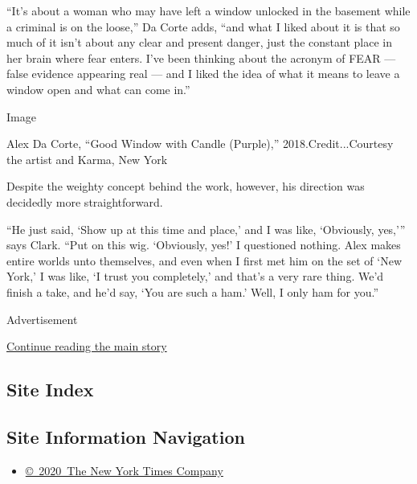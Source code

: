 ``It's about a woman who may have left a window unlocked in the basement
while a criminal is on the loose,'' Da Corte adds, ``and what I liked
about it is that so much of it isn't about any clear and present danger,
just the constant place in her brain where fear enters. I've been
thinking about the acronym of FEAR --- false evidence appearing real ---
and I liked the idea of what it means to leave a window open and what
can come in.''

Image

Alex Da Corte, ``Good Window with Candle (Purple),''
2018.Credit...Courtesy the artist and Karma, New York

Despite the weighty concept behind the work, however, his direction was
decidedly more straightforward.

``He just said, `Show up at this time and place,' and I was like,
`Obviously, yes,''' says Clark. ``Put on this wig. `Obviously, yes!' I
questioned nothing. Alex makes entire worlds unto themselves, and even
when I first met him on the set of `New York,' I was like, `I trust you
completely,' and that's a very rare thing. We'd finish a take, and he'd
say, `You are such a ham.' Well, I only ham for you.''

Advertisement

\protect\hyperlink{after-bottom}{Continue reading the main story}

\hypertarget{site-index}{%
\subsection{Site Index}\label{site-index}}

\hypertarget{site-information-navigation}{%
\subsection{Site Information
Navigation}\label{site-information-navigation}}

\begin{itemize}
\tightlist
\item
  \href{https://help.nytimes3xbfgragh.onion/hc/en-us/articles/115014792127-Copyright-notice}{©~2020~The
  New York Times Company}
\end{itemize}

